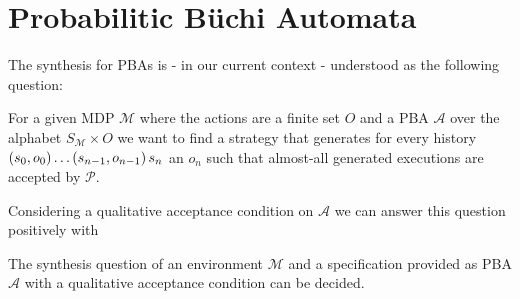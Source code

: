 \section{Probabilitic Büchi Automata}
The synthesis for \acp{PBA} is - in our current context - understood as the
following question:
\begin{definition}
  For a given \ac{MDP} $\mathcal{M}$ where the actions are a finite set $O$ and
  a \ac{PBA} $\mathcal{A}$ over the alphabet $S_{\mathcal{M}}\times O$ we want
  to find a strategy that generates for every history
  $\left(s_{0}, o_{0}\right)\dots\left(s_{n-1},o_{n-1}\right)s_{n}$ an
  $o_{n}$ such that almost-all generated executions are accepted by
  $\mathcal{P}$.
  \label{def:synthesis}
\end{definition}
Considering a qualitative acceptance condition on $\mathcal{A}$ we can answer
this question positively with
\begin{theorem}
  The synthesis question of an environment $\mathcal{M}$ and a specification
  provided as \ac{PBA} $\mathcal{A}$ with a qualitative acceptance condition
  can be decided.
  \label{thm:synthesis}
\end{theorem}
